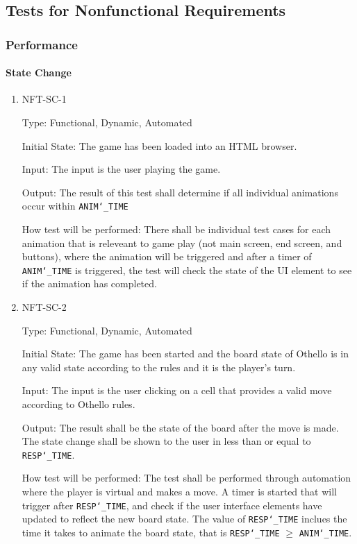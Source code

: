 \documentclass[12pt, titlepage]{article}
\begin{document}
\subsection{Tests for Nonfunctional Requirements}
\subsubsection{Performance}
\paragraph{State Change}

\begin{enumerate}
	\item NFT-SC-1

	      Type: Functional, Dynamic, Automated

	      Initial State: The game has been loaded into an HTML browser.

	      Input: The input is the user playing the game.

	      Output: The result of this test shall determine if all individual animations occur within \texttt{ANIM\char`_TIME}

	      How test will be performed: There shall be individual test cases for each animation that is releveant to game play (not main screen, end screen, and buttons), where the animation will be triggered and after a timer of \texttt{ANIM\char`_TIME} is triggered, the test will check the state of the UI element to see if the animation has completed.

	\item NFT-SC-2

	      Type: Functional, Dynamic, Automated

	      Initial State: The game has been started and the board state of Othello is in any valid state according to the rules and it is the player's turn.

	      Input: The input is the user clicking on a cell that provides a valid move according to Othello rules.

	      Output: The result shall be the state of the board after the move is made. The state change shall be shown to the user in less than or equal to \texttt{RESP\char`_TIME}.

	      How test will be performed: The test shall be performed through automation where the player is virtual and makes a move. A timer is started that will trigger after \texttt{RESP\char`_TIME}, and check if the user interface elements have updated to reflect the new board state. The value of \texttt{RESP\char`_TIME} inclues the time it takes to animate the board state, that is \texttt{RESP\char`_TIME} $\geq$ \texttt{ANIM\char`_TIME}.


\end{enumerate}
\end{document}
